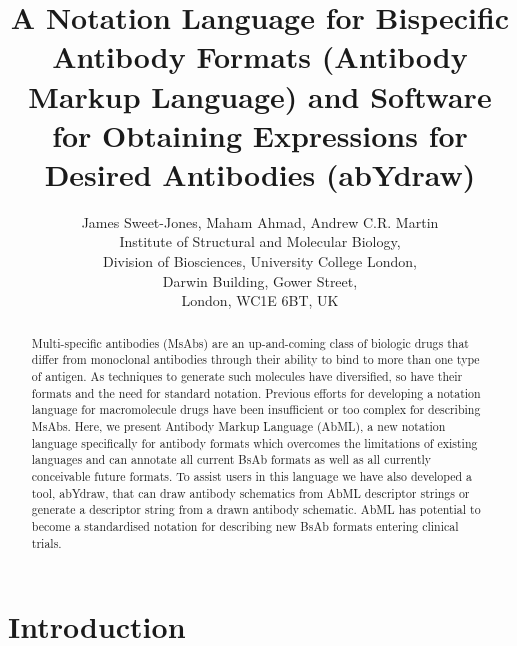 \documentclass{article}
\title{A Notation Language for Bispecific Antibody Formats (Antibody
Markup Language) and Software for Obtaining Expressions for Desired
Antibodies (abYdraw)}
\author{James Sweet-Jones, Maham Ahmad, Andrew C.R. Martin\\
Institute of Structural and Molecular Biology,\\
Division of Biosciences, University College London,\\
Darwin Building, Gower Street,\\
London, WC1E 6BT, UK}
\begin{document}
\maketitle

\begin{abstract}
Multi-specific antibodies (MsAbs) are an up-and-coming class of biologic
drugs that differ from monoclonal antibodies through their ability to
bind to more than one type of antigen. As techniques to generate such
molecules have diversified, so have their formats and the need for
standard notation. Previous efforts for developing a notation language
for macromolecule drugs have been insufficient or too complex for describing
MsAbs. Here, we present Antibody Markup Language (AbML), a new
notation language specifically for antibody formats which overcomes
the limitations of existing languages and can annotate all
current BsAb formats as well as all currently conceivable future formats.
To assist users in this language we have also
developed a tool, abYdraw, that can draw antibody schematics from AbML
descriptor strings or generate a descriptor string from a drawn
antibody schematic. AbML has potential to become a standardised
notation for describing new BsAb formats entering clinical trials.
\end{abstract}

\section{Introduction}
\end{document}
